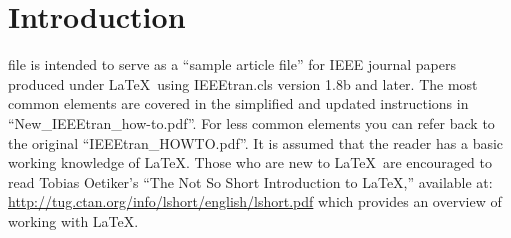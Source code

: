 \section{Introduction}
 file is intended to serve as a ``sample article file''
for IEEE journal papers produced under \LaTeX\ using
IEEEtran.cls version 1.8b and later. The most common elements are covered in the
simplified and updated instructions in ``New\_IEEEtran\_how-to.pdf''. For less
common elements you can refer back to the original ``IEEEtran\_HOWTO.pdf''. It
is assumed that the reader has a basic working knowledge of \LaTeX. Those who
are new to \LaTeX \ are encouraged to read Tobias Oetiker's ``The Not So Short
Introduction to \LaTeX ,'' available at:
\url{http://tug.ctan.org/info/lshort/english/lshort.pdf} which provides an
overview of working with \LaTeX.